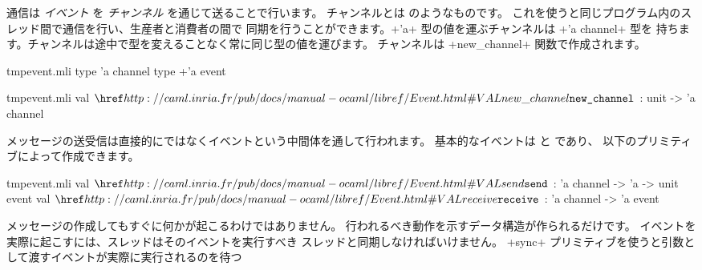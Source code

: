 通信は \emph{イベント} を \emph{チャンネル} を通じて送ることで行います。
チャンネルとは  のようなものです。
これを使うと同じプログラム内のスレッド間で通信を行い、生産者と消費者の間で
同期を行うことができます。\ml+'a+ 型の値を運ぶチャンネルは \ml+'a channel+ 型を
持ちます。チャンネルは途中で型を変えることなく常に同じ型の値を運びます。
チャンネルは \ml+new_channel+ 関数で作成されます。
%
\begin{codefile}{tmpevent.mli}
type 'a channel
type +'a event
\end{codefile}
%
\begin{listingcodefile}{tmpevent.mli}
val $\indexlibvalue{Event}{new\_channel}$ : unit -> 'a channel
\end{listingcodefile}
%
メッセージの送受信は直接的にではなくイベントという中間体を通して行われます。
基本的なイベントは  と  であり、
以下のプリミティブによって作成できます。
%
\begin{listingcodefile}{tmpevent.mli}
val $\indexlibvalue{Event}{send}$ : 'a channel -> 'a -> unit event
val $\indexlibvalue{Event}{receive}$ : 'a channel -> 'a event
\end{listingcodefile}
%
メッセージの作成してもすぐに何かが起こるわけではありません。
行われるべき動作を示すデータ構造が作られるだけです。
イベントを実際に起こすには、スレッドはそのイベントを実行すべき
スレッドと同期しなければいけません。
\ml+sync+ プリミティブを使うと引数として渡すイベントが実際に実行されるのを待つ
